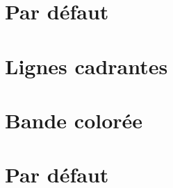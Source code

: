\documentclass{../main/main}
\begin{document}
\section{Par défaut}

\begin{tdocshowcase}
  \itshape
  \lipsum[2]
\end{tdocshowcase}


\section{Lignes cadrantes}

\begin{tdocshowcase}[style = rule]
  \itshape
  \lipsum[2]
\end{tdocshowcase}


\section{Bande colorée}

\begin{tdocshowcase}[style = stripe]
  \itshape
  \lipsum[2]
\end{tdocshowcase}


\section{Par défaut}

\begin{tdocshowcase}
  \itshape
  \lipsum[2]
\end{tdocshowcase}
\end{document}
